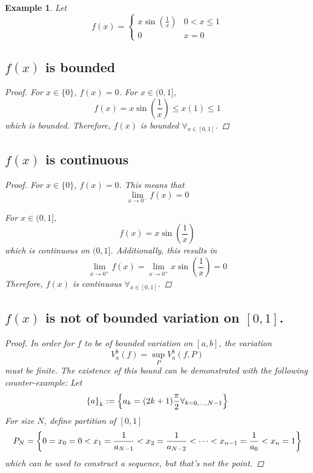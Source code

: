 \documentclass[]{article}
\newtheorem{example}{Example}
\begin{document}
\begin{example}
    Let \[
        f(x) = \begin{cases}
            x \sin(\frac{1}{x}) & 0 < x \leq 1\\
            0 & x = 0
        \end{cases}
    \] 
    \subsection{$f(x)$ is bounded}
    \begin{proof}
        For $x \in \{0\}$, $f(x) = 0$. 
        For $x \in (0,1]$, \[
            f(x) = x \sin(\frac{1}{x}) \leq x (1) \leq 1
        \] which is bounded. 
        Therefore, $f(x)$ is bounded $\forall_{x \in [0,1]}$.
    \end{proof}

    \subsection{$f(x)$ is continuous}
    \begin{proof}
        For $x \in \{0\}$, $f(x) = 0$.
        This means that \[
            \lim_{x \to 0^{-}} f(x) = 0
        \]
        
        For $x \in (0,1]$, \[
            f(x) = x \sin(\frac{1}{x})
        \] which is continuous on $(0,1]$.
        Additionally, this results in \[
            \lim_{x\to 0^{+}} f(x) = \lim_{x\to 0^{+}} x \sin(\frac{1}{x}) = 0
        \]
        Therefore, $f(x)$ is continuous $\forall_{x \in [0,1]}$.
    \end{proof}

    \subsection{$f(x)$ is not of bounded variation on $[0,1]$.}
    \begin{proof}
        In order for $f$ to be of bounded variation on $[a,b]$, the variation \[
            V_{a}^{b}(f) = \sup_{P} V_{a}^{b} (f,P)
        \] must be finite. 
        The existence of this bound can be demonstrated with the following counter-example:
        Let \[
            \qty{a}_k := \qty{a_k = (2 k + 1) \frac{\pi}{2} \forall_{k = 0, \dots, N-1}}
        \] For size $N$, define partition of $[0,1]$ \[
            P_N = \qty{
                0 = x_0 = 0 < x_1 = \frac{1}{a_{N-1}} < x_2 = \frac{1}{a_{N-2}} 
                < \cdots < x_{n-1} = \frac{1}{a_0} < x_{n} = 1
            }
        \] which can be used to construct a sequence, but that's not the point.


\end{proof}
\end{example}
\end{document}
